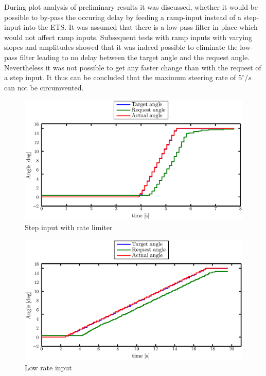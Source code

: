 \documentclass[ExampleMasters.tex]{subfiles}
\begin{document}
During plot analysis of preliminary results it was discussed, whether it would be possible to by-pass the occuring delay by feeding a ramp-input instead of a step-input into the \gls{ETS}. It was assumed that there is a low-pass filter in place which would not affect ramp inputs. Subsequent tests with ramp inputs with varying slopes and amplitudes showed that it was indeed possible to eliminate the low-pass filter leading to no delay between the target angle and the request angle. Nevertheless it was not possible to get any faster change than with the request of a step input. It thus can be concluded that the maximum steering rate of $5 ^\circ /s$ can not be circumvented.
\begin{figure}[h]
	\centering
	\includegraphics[width=1\linewidth]{figures/rate_limiter1}
	\caption{Step input with rate limiter}
	
	\label{fig:rate_limiter1}
\end{figure}
\begin{figure}[h]
	\centering
	\includegraphics[width=1\linewidth]{figures/rate_limiter2}
	\caption{Low rate input}
	
	\label{fig:rate_limiter2}
\end{figure}
\end{document}
